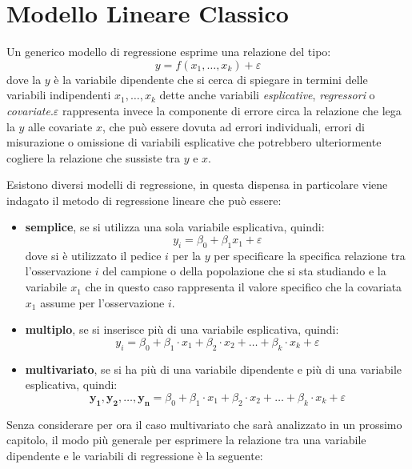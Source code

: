\chapter{Modello Lineare Classico} 
Un generico modello di regressione esprime una relazione del tipo:
\begin{equation}
	y = f(x_1, \dots, x_k) + \varepsilon
\end{equation}
dove la $y$ è la variabile dipendente che si cerca di spiegare in termini delle variabili indipendenti $x_1, \dots, x_k$ dette anche variabili \textit{esplicative}, \textit{regressori} o \textit{covariate}.$\varepsilon$ rappresenta invece la componente di errore circa la relazione che lega la $y$ alle covariate $x$, che può essere dovuta ad errori individuali, errori di misurazione o omissione di variabili esplicative che potrebbero ulteriormente cogliere la relazione che sussiste tra $y$ e $x$.

Esistono diversi modelli di regressione, in questa dispensa in particolare viene indagato il metodo di regressione lineare che può essere:
\begin{itemize}
	\item \textbf{semplice}, se si utilizza una sola variabile esplicativa, quindi:
	\begin{equation}
		y_i = \beta_0 + \beta_1 x_1 + \varepsilon
	\end{equation}
	dove si è utilizzato il pedice $i$ per la $y$ per specificare la specifica relazione tra l'osservazione $i$ del campione o della popolazione che si sta studiando e la variabile $x_1$ che in questo caso rappresenta il valore specifico che la covariata $x_1$ assume per l'osservazione $i$. 
	\item \textbf{multiplo}, se si inserisce più di una variabile esplicativa, quindi:
	\begin{equation}
		y_i = \beta_0 + \beta_1 \cdot x_1 + \beta_2 \cdot x_2 + \dots + \beta_k \cdot x_k + \varepsilon
	\end{equation}
	\item \textbf{multivariato}, se si ha più di una variabile dipendente e più di una variabile esplicativa, quindi:
	\begin{equation}
		\mathbf{y_1}, \mathbf{y_2}, \dots, \mathbf{y_n} = \beta_0 + \beta_1 \cdot x_1 + \beta_2 \cdot x_2 + \dots + \beta_k \cdot x_k + \varepsilon
	\end{equation}
\end{itemize}
Senza considerare per ora il caso multivariato che sarà analizzato in un prossimo capitolo, il modo più generale per esprimere la relazione tra una variabile dipendente e le variabili di regressione è la seguente:


